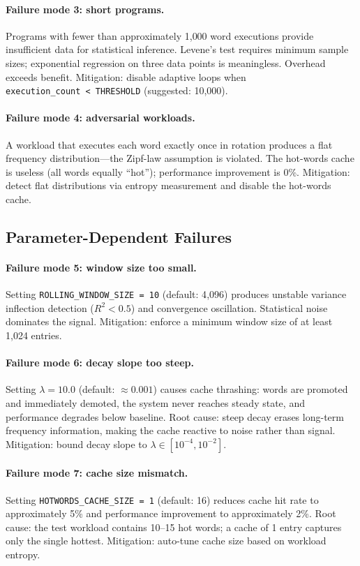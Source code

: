 \paragraph{Failure mode 3: short programs.}
Programs with fewer than approximately 1{,}000 word executions provide
insufficient data for statistical inference. Levene's test requires minimum
sample sizes; exponential regression on three data points is meaningless.
Overhead exceeds benefit. Mitigation: disable adaptive loops when
\texttt{execution\_count~<~THRESHOLD} (suggested: 10{,}000).

\paragraph{Failure mode 4: adversarial workloads.}
A workload that executes each word exactly once in rotation produces a flat
frequency distribution---the Zipf-law assumption is violated. The hot-words
cache is useless (all words equally ``hot''); performance improvement is 0\%.
Mitigation: detect flat distributions via entropy measurement and disable the
hot-words cache.

\subsection{Parameter-Dependent Failures}

\paragraph{Failure mode 5: window size too small.}
Setting \texttt{ROLLING\_WINDOW\_SIZE = 10} (default: 4{,}096) produces
unstable variance inflection detection ($R^2 < 0.5$) and convergence
oscillation. Statistical noise dominates the signal. Mitigation: enforce a
minimum window size of at least 1{,}024 entries.

\paragraph{Failure mode 6: decay slope too steep.}
Setting $\lambda = 10.0$ (default: ${\approx}0.001$) causes cache thrashing:
words are promoted and immediately demoted, the system never reaches steady
state, and performance degrades below baseline. Root cause: steep decay erases
long-term frequency information, making the cache reactive to noise rather
than signal. Mitigation: bound decay slope to $\lambda \in [10^{-4}, 10^{-2}]$.

\paragraph{Failure mode 7: cache size mismatch.}
Setting \texttt{HOTWORDS\_CACHE\_SIZE = 1} (default: 16) reduces cache hit
rate to approximately 5\% and performance improvement to approximately 2\%.
Root cause: the test workload contains 10--15 hot words; a cache of 1 entry
captures only the single hottest. Mitigation: auto-tune cache size based on
workload entropy.

